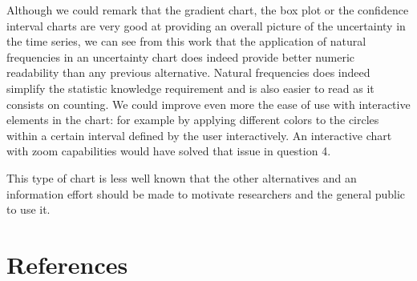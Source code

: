 \documentclass[a4paper,3p,sort&compress]{elsarticle}
\begin{document}
Although we could remark that the gradient chart, the box plot or the confidence interval charts are very good at 
providing an overall picture of the uncertainty in the time series, we can see from this work that the application of natural 
frequencies in an uncertainty chart does indeed
provide better numeric readability than any previous alternative. Natural frequencies does indeed simplify 
the statistic knowledge requirement and is also easier to read as it consists on counting.
We could improve even more the ease of use with interactive elements in the chart: for example
by applying different colors to the circles within a certain interval defined by the user interactively.
An interactive chart with zoom capabilities would have solved that 
issue in question 4.

This type of chart is less well known that the other alternatives and an information effort should be made to motivate 
researchers and the general public to use it.

\section{References}
\label{sec:ref}



\end{document}
